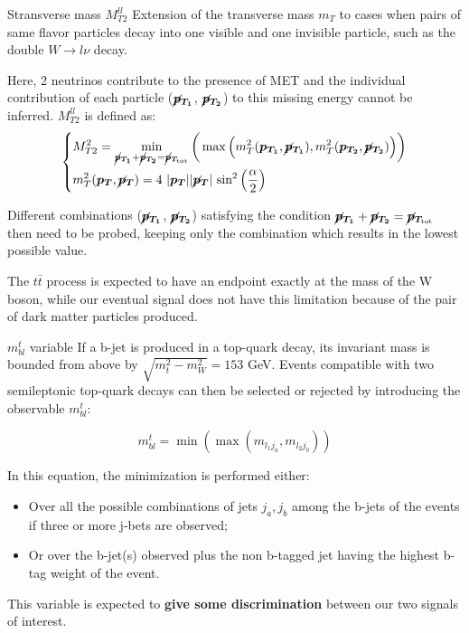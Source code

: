\documentclass[8pt]{beamer}
\begin{document}
\begin{frame}{Stransverse mass $M_{T2}^{ll}$}
\justifying
Extension of the transverse mass $m_T$ to cases when pairs of same flavor particles decay into one visible and one invisible particle, such as the double $W \rightarrow l\nu$ decay. \vfill

Here, 2 neutrinos contribute to the presence of MET and the individual contribution of each particle ($\bm{\cancel{p}_{T_{1}}}$, $\bm{\cancel{p}_{T_2}}$) to this missing energy cannot be inferred. $M_{T2}^{ll}$ is defined as:
\begin{equation*}
\begin{dcases}
M_{T2}^2 = \min_{\bm{\cancel{p}_{T_{1}}} + \bm{\cancel{p}_{T_{2}}} = \bm{\cancel{p}_{T_{\text{tot}}}}} \bigg (\max \Big (m_T^2(\bm{p_{T_1}}, \bm{\cancel{p}_{T_{1}}}), m_T^2(\bm{p_{T_2}}, \bm{\cancel{p}_{T_{2}}}) \Big ) \bigg ) \\
m_T^2(\bm{p_{T}}, \bm{\cancel{p}_{T}}) = 4 \text{ } |\bm{p_{T}}| |\bm{\cancel{p}_{T}}| \text{ sin}^2 \left (\frac{\alpha}{2} \right ) 
\end{dcases}
\end{equation*} \vfill

Different combinations ($\bm{\cancel{p}_{T_{1}}}$, $\bm{\cancel{p}_{T_{2}}}$) satisfying the condition $\bm{\cancel{p}_{T_{1}}} + \bm{\cancel{p}_{T_{2}}} = \bm{\cancel{p}_{T_{\text{tot}}}}$ then need to be probed, keeping only the combination which results in the lowest possible value. \vfill

The $t \bar t$ process is expected to have an endpoint exactly at the mass of the W boson, while our eventual signal does not have this limitation because of the pair of dark matter particles produced. \vfill
\end{frame}

\begin{frame}{$m_{bl}^t$ variable}
\justifying
If a b-jet is produced in a top-quark decay, its invariant mass is bounded from above by $\sqrt{m_t^2 - m_{W}^2} = 153$ GeV. Events compatible with two semileptonic top-quark decays can then be selected or rejected by introducing the observable $m_{bl}^t$: \vfill

\begin{equation*}
m_{bl}^t = \min \left (\max(m_{l_1 j_a}, m_{l_2 j_b}) \right)
\end{equation*} \vfill

In this equation, the minimization is performed either:
\begin{itemize}
\justifying
\item Over all the possible combinations of jets {$j_a, j_b$} among the b-jets of the events if three or more j-bets are observed;
\item Or over the b-jet(s) observed plus the non b-tagged jet having the highest b-tag weight of the event.
\end{itemize} \vfill 

This variable is expected to \textbf{give some discrimination} between our two signals of interest. \vfill
\end{frame}
\end{document}
